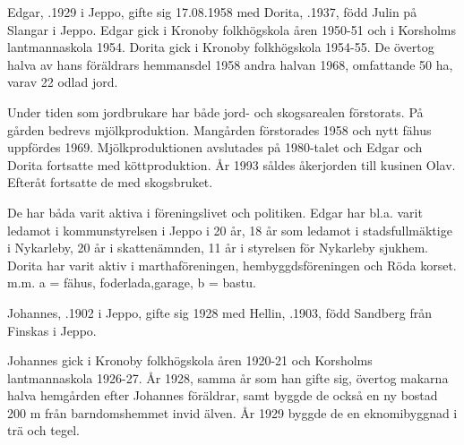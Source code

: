 
%
Edgar, .1929 i Jeppo, gifte sig 17.08.1958 med Dorita, .1937, född Julin på Slangar i Jeppo.
Edgar gick i Kronoby folkhögskola åren 1950-51 och i Korsholms lantmannaskola 1954. Dorita gick i Kronoby folkhögskola 1954-55. De övertog halva av hans föräldrars hemmansdel 1958 andra halvan 1968, omfattande 50 ha, varav 22 odlad jord.

Under tiden som jordbrukare har både jord- och skogsarealen förstorats. På gården bedrevs mjölkproduktion. Mangården förstorades 1958 och nytt fähus uppfördes 1969. Mjölkproduktionen avslutades på 1980-talet och Edgar och Dorita fortsatte med köttproduktion. År 1993 såldes åkerjorden till kusinen Olav. Efteråt fortsatte de med skogsbruket.


De har båda varit aktiva i föreningslivet och politiken. Edgar har bl.a. varit ledamot i kommunstyrelsen i Jeppo i 20 år, 18 år som ledamot i stadsfullmäktige i Nykarleby, 20 år i skattenämnden, 11 år i styrelsen för Nykarleby sjukhem. Dorita har varit aktiv i marthaföreningen, hembyggdsföreningen och Röda korset. m.m. a = fähus, foderlada,garage, b = bastu.


%
Johannes, .1902 i Jeppo, gifte sig 1928 med Hellin, .1903, född Sandberg från Finskas i Jeppo.
\begin{jhchildren}
  \item {}
  \item {}
  \item {}
\end{jhchildren}
Johannes gick i Kronoby folkhögskola åren 1920-21 och Korsholms lantmannaskola 1926-27. År 1928, samma år som han gifte sig, övertog makarna halva hemgården efter Johannes föräldrar, samt byggde de också en ny bostad 200 m från barndomshemmet invid älven. År 1929 byggde de en eknomibyggnad i trä och tegel.

